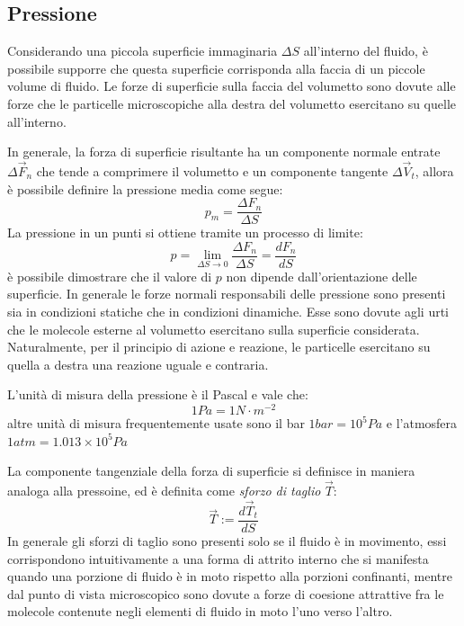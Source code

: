 \documentclass[11pt, a4paper, openright]{book}
\theoremstyle{plain}
\theoremstyle{definition}
\begin{document}
\subsection{Pressione}
Considerando una piccola superficie immaginaria $\Delta S$ all'interno del fluido, è possibile supporre che questa superficie corrisponda alla faccia di un piccole volume di fluido.
Le forze di superficie sulla faccia del volumetto sono dovute alle forze che le particelle microscopiche alla destra del volumetto esercitano su quelle all'interno.

In generale, la forza di superficie risultante ha un componente normale entrate $\Delta \vec{F}_n$ che tende a comprimere il volumetto e un componente tangente $\Delta \vec{V}_t$, allora è possibile definire la pressione media come segue:
\begin{equation}
    p_m = \frac{\Delta F_n}{\Delta S}
\end{equation}
La pressione in un punti si ottiene tramite un processo di limite:
\begin{equation}
    p = \lim_{\Delta S \to 0} \frac{\Delta F_n}{\Delta S} = \frac{dF_n}{dS}
\end{equation}
è possibile dimostrare che il valore di $p$ non dipende dall'orientazione delle superficie. 
In generale le forze normali responsabili delle pressione sono presenti sia in condizioni statiche che in condizioni dinamiche. Esse sono dovute agli urti che le molecole esterne al volumetto esercitano sulla superficie considerata. Naturalmente, per il principio di azione e reazione, le particelle esercitano su quella a destra una reazione uguale e contraria.

L'unità di misura della pressione è il Pascal e vale che:
\begin{equation}
    1 Pa = 1 N \cdot m^{-2}
\end{equation}
altre unità di misura frequentemente usate sono il bar $1 bar = 10^5 Pa$ e l'atmosfera $1 atm = 1.013 \times 10^5 Pa$

La componente tangenziale della forza di superficie si definisce in maniera analoga alla pressoine, ed è definita come \textit{sforzo di taglio} $\vec{T}$:
\begin{equation}
    \vec{T} := \frac{d\vec{T}_t}{dS}
\end{equation}
In generale gli sforzi di taglio sono presenti solo se il fluido è in movimento, essi corrispondono intuitivamente a una forma di attrito interno che si manifesta quando una porzione di fluido è in moto rispetto alla porzioni confinanti, mentre dal punto di vista microscopico sono dovute a forze di coesione attrattive fra le molecole contenute negli elementi di fluido in moto l'uno verso l'altro.
\end{document}
